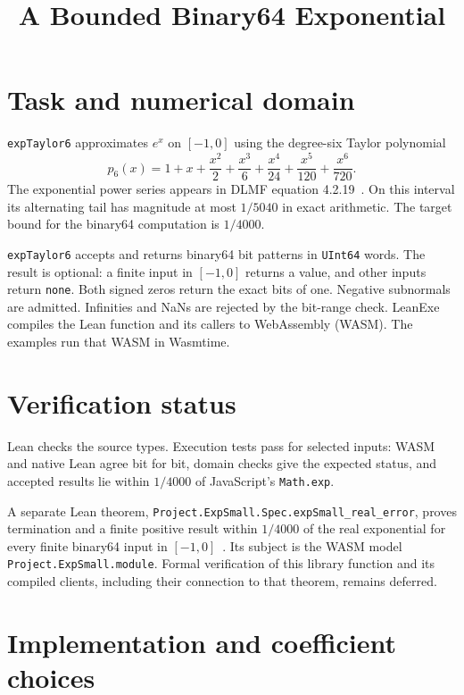 
\title{A Bounded Binary64 Exponential}

\maketitle

\section{Task and numerical domain}
\texttt{expTaylor6} approximates $e^x$ on $[-1,0]$ using the degree-six
Taylor polynomial
\[
  p_6(x)=1+x+\frac{x^2}{2}+\frac{x^3}{6}
         +\frac{x^4}{24}+\frac{x^5}{120}+\frac{x^6}{720}.
\]
The exponential power series appears in DLMF equation 4.2.19~\cite{series}.
On this interval its alternating tail has magnitude at most $1/5040$ in exact
arithmetic.  The target bound for the binary64 computation is $1/4000$.

\texttt{expTaylor6} accepts and returns binary64 bit patterns in
\texttt{UInt64} words.  The result is optional: a finite input in $[-1,0]$
returns a value, and other inputs return \texttt{none}.  Both signed zeros
return the exact bits of one.  Negative subnormals are admitted.  Infinities
and NaNs are rejected by the bit-range check.
LeanExe compiles the Lean function and its callers to WebAssembly (WASM).
The examples run that WASM in Wasmtime.

\section{Verification status}
Lean checks the source types.  Execution tests pass for selected inputs:
WASM and native Lean agree bit for bit, domain checks give the expected status,
and accepted results lie within $1/4000$ of JavaScript's \texttt{Math.exp}.

A separate Lean theorem, \texttt{Project.ExpSmall.Spec.expSmall\_real\_error},
proves termination and a finite positive result within $1/4000$ of the real
exponential for every finite binary64 input in $[-1,0]$~\cite{prior}.
Its subject is the WASM model \texttt{Project.ExpSmall.module}.
Formal verification of this library function and its compiled clients,
including their connection to that theorem, remains deferred.

\section{Implementation and coefficient choices}


